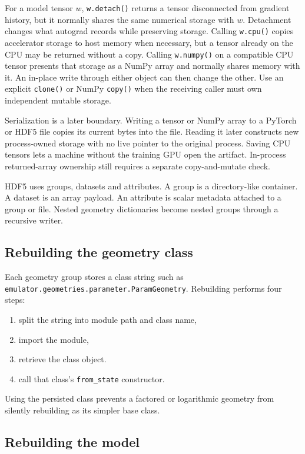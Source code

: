 \documentclass[10pt,aps,prd,twocolumn,nofootinbib]{revtex4-2}
\newcommand{\code}[1]{\texttt{#1}}
\begin{document}
For a model tensor $w$,
\code{w.detach()} returns a tensor disconnected from gradient history, but it
normally shares the same numerical storage with $w$.  Detachment changes what
autograd records while preserving storage.  Calling \code{w.cpu()} copies
accelerator storage to host memory when necessary, but a tensor already on the
CPU may be returned without a copy.  Calling \code{w.numpy()} on a compatible
CPU tensor presents that storage as a NumPy array and normally shares memory
with it.  An in-place write through either object can then change the other.
Use an explicit \code{clone()} or NumPy \code{copy()} when the receiving caller
must own independent mutable storage.

Serialization is a later boundary.  Writing a tensor or NumPy array to a
PyTorch or HDF5 file copies its current bytes into the file.  Reading it later
constructs new process-owned storage with no live pointer to the original
process.  Saving CPU tensors lets a machine without the training GPU open the
artifact.  In-process returned-array ownership still requires a separate
copy-and-mutate check.

HDF5 uses groups, datasets and attributes.  A group is a directory-like
container.  A dataset is an array payload.  An attribute is scalar metadata
attached to a group or file.  Nested geometry dictionaries become nested
groups through a recursive writer.

\subsection{Rebuilding the geometry class}

Each geometry group stores a class string such as
\code{emulator.geometries.parameter.ParamGeometry}.  Rebuilding performs four
steps:
\begin{enumerate}
  \item split the string into module path and class name,
  \item import the module,
  \item retrieve the class object.
  \item call that class's \code{from\_state} constructor.
\end{enumerate}
Using the persisted class prevents a factored or logarithmic geometry from
silently rebuilding as its simpler base class.

\subsection{Rebuilding the model}
\end{document}
